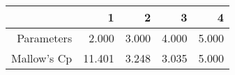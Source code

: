 \begin{table}[ht]
\centering
\begin{tabular}{rrrrr}
  \hline
 & 1 & 2 & 3 & 4 \\ 
  \hline
Parameters & 2.000 & 3.000 & 4.000 & 5.000 \\ 
  Mallow's Cp & 11.401 & 3.248 & 3.035 & 5.000 \\ 
   \hline
\end{tabular}
\end{table}
